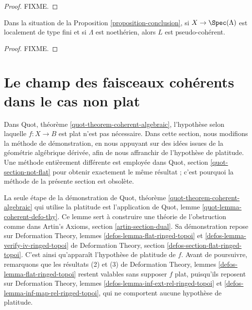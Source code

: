 \begin{proof}
FIXME.
\end{proof}

\begin{lemma}
\label{lemma-pseudo-coherent}
Dans la situation de la Proposition \ref{proposition-conclusion}, si
$X \to \Spec(\Lambda)$ est localement de type fini et si $\Lambda$ est
noeth\'erien, alors $L$ est pseudo-coh\'erent.
\end{lemma}

\begin{proof}
FIXME.
\end{proof}


\section{Le champ des faisceaux cohérents dans le cas non plat}
\label{section-not-flat}

\noindent
Dans Quot, théorème \ref{quot-theorem-coherent-algebraic},
l'hypothèse selon laquelle $f : X \to B$ est plat n'est pas nécessaire.
Dans cette section, nous modifions la méthode de démonstration, en nous
appuyant sur des idées issues de la géométrie algébrique dérivée, afin de nous
affranchir de l'hypothèse de platitude. Une méthode entièrement différente est
employée dans Quot, section \ref{quot-section-not-flat} pour obtenir exactement
le même résultat ; c'est pourquoi la méthode de la présente section est
obsolète.

\medskip\noindent
La seule étape de la démonstration de
Quot, théorème \ref{quot-theorem-coherent-algebraic}
qui utilise la platitude est l'application de
Quot, lemme \ref{quot-lemma-coherent-defo-thy}.
Ce lemme sert à construire une théorie de l'obstruction comme dans
Artin's Axioms, section \ref{artin-section-dual}.
Sa démonstration repose sur
Deformation Theory, lemmes \ref{defos-lemma-flat-ringed-topoi} et
\ref{defos-lemma-verify-iv-ringed-topoi} de
Deformation Theory, section \ref{defos-section-flat-ringed-topoi}.
C'est ainsi qu'apparaît l'hypothèse de platitude de $f$.
Avant de poursuivre, remarquons que les résultats (2) et (3) de
Deformation Theory, lemmes \ref{defos-lemma-flat-ringed-topoi}
restent valables sans supposer $f$ plat, puisqu'ils reposent sur
Deformation Theory, lemmes \ref{defos-lemma-inf-ext-rel-ringed-topoi}
et \ref{defos-lemma-inf-map-rel-ringed-topoi},
qui ne comportent aucune hypothèse de platitude.

